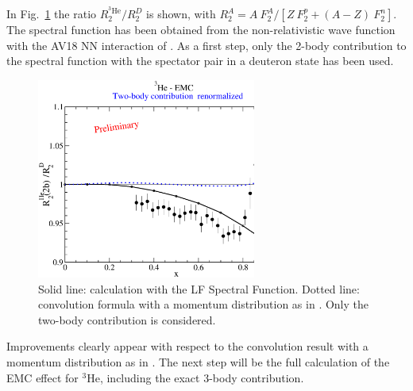 { In Fig.~\ref{fig:pace} the ratio $R_2^{^3\mathrm{He}}/R_2^D$ is shown, with $R_2^A = A~ F_2^A/[Z ~F_2^p + (A-Z)~F_2^n]$.
The  spectral function has been obtained from the non-relativistic wave function  with the AV18 NN interaction of \cite{KRV}. As a first step, only
the 2-body contribution 
to the spectral function with the spectator pair  in a {{deuteron state}}
has been used.
 \begin{figure}
\centerline{\includegraphics[width=7.2cm]{plots/emc_018.eps}}
 \caption{Solid line: calculation with the {{LF Spectral Function}}. 
\label{fig:pace}
Dotted line: {convolution formula  with a momentum distribution as in \cite{Sauer}}. Only  the two-body contribution is considered.}
 \end{figure}
{{Improvements clearly appear with respect to the
convolution result with a momentum distribution as in \cite{Sauer}}.
The next step will be the full calculation of the EMC effect for $^3\mathrm{He}$, including the exact
3-body contribution. 
}}

